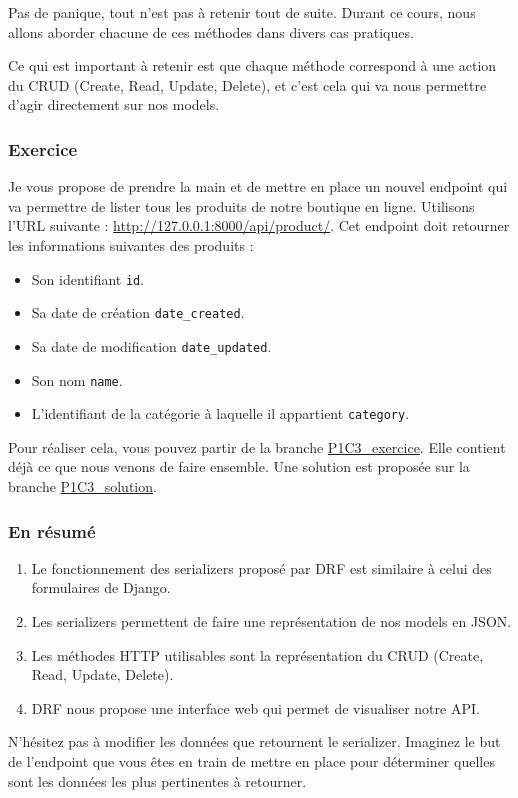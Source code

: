 \documentclass[a4paper]{article}
\begin{document}
Pas de panique, tout n’est pas à retenir tout de suite. Durant ce cours, nous allons aborder chacune de ces méthodes dans divers cas pratiques.

Ce qui est important à retenir est que chaque méthode correspond à une action du CRUD (Create, Read, Update, Delete), et c’est cela qui va nous permettre d’agir directement sur nos models.

\subsubsection*{Exercice}
Je vous propose de prendre la main et de mettre en place un nouvel endpoint qui va permettre de lister tous les produits de notre boutique en ligne. Utilisons l’URL suivante : \url{http://127.0.0.1:8000/api/product/}. Cet endpoint doit retourner les informations suivantes des produits :
\begin{itemize}
\item Son identifiant  {\tt id}.
\item Sa date de création  {\tt date\_created}.
\item Sa date de modification  {\tt date\_updated}.
\item Son nom  {\tt name}.
\item L’identifiant de la catégorie à laquelle il appartient  {\tt category}.
\end{itemize}
Pour réaliser cela, vous pouvez partir de la branche \href{https://github.com/OpenClassrooms-Student-Center/7192416\_APIs\_DRF/tree/P1C3\_exercice}{P1C3\_exercice}. Elle contient déjà ce que nous venons de faire ensemble. Une solution est proposée sur la branche \href{https://github.com/OpenClassrooms-Student-Center/7192416\_APIs\_DRF/tree/P1C3\_solution}{P1C3\_solution}.

\subsubsection*{En résumé}
\begin{enumerate}
\item Le fonctionnement des serializers proposé par DRF est similaire à celui des formulaires de Django.
\item Les serializers permettent de faire une représentation de nos models en JSON.
\item Les méthodes HTTP utilisables sont la représentation du CRUD (Create, Read, Update, Delete).
\item DRF nous propose une interface web qui permet de visualiser notre API.
\end{enumerate}
N’hésitez pas à modifier les données que retournent le serializer. Imaginez le but de l’endpoint que vous êtes en train de mettre en place pour déterminer quelles sont les données les plus pertinentes à retourner.
\end{document}
